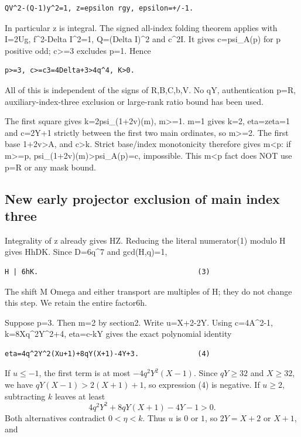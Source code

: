 \begin{verbatim}
QV^2-(Q-1)y^2=1, z=epsilon rgy, epsilon=+/-1.
\end{verbatim}

In particular z is integral. The signed all-index folding theorem
applies with I=2Ug, f\^{}2-Delta I\^{}2=1, Q=(Delta I)\^{}2 and
c\^{}2\textbar I. It gives c=psi\_A(p) for p positive odd;
c\textgreater=3 excludes p=1. Hence

\begin{verbatim}
p>=3, c>=c3=4Delta+3>4q^4, K>0.
\end{verbatim}

All of this is independent of the signs of R,B,C,b,V. No q\textbar Y,
authentication p=R, auxiliary-index-three exclusion or large-rank ratio
bound has been used.

The first square gives k=2psi\_(1+2v)(m), m\textgreater=1. m=1 gives
k=2, eta=zeta=1 and c=2Y+1 strictly between the first two main
ordinates, so m\textgreater=2. The first base 1+2v\textgreater A, and
c\textgreater k. Strict base/index monotonicity therefore gives
m\textless p: if m\textgreater=p,
psi\_(1+2v)(m)\textgreater psi\_A(p)=c, impossible. This m\textless p
fact does NOT use p=R or any mask bound.

\subsection{New early projector exclusion of main index
three}\label{new-early-projector-exclusion-of-main-index-three}

Integrality of z already gives H\textbar Z. Reducing the literal
numerator(1) modulo H gives H\textbar hDK. Since D=6q\^{}7 and
gcd(H,q)=1,

\begin{verbatim}
H | 6hK.                                      (3)
\end{verbatim}

The shift M Omega and either transport are multiples of H; they do not
change this step. We retain the entire factor6h.

Suppose p=3. Then m=2 by section2. Write u=X+2-2Y. Using c=4A\^{}2-1,
k=8Xq\^{}2Y\^{}2+4, eta=c-kY gives the exact polynomial identity

\begin{verbatim}
eta=4q^2Y^2(Xu+1)+8qY(X+1)-4Y+3.              (4)
\end{verbatim}

If $u\le-1$, the first term is at most $-4q^2Y^2(X-1)$.
Since $qY\ge32$ and $X\ge32$, we have
$qY(X-1)>2(X+1)+1$, so expression (4) is negative.
If $u\ge2$, subtracting $k$ leaves at least
\[
4q^2Y^2+8qY(X+1)-4Y-1>0.
\]
Both alternatives contradict $0<\eta<k$. Thus $u$ is $0$ or $1$,
so $2Y=X+2$ or $X+1$, and

